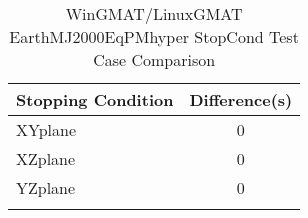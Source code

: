 \begin{table}[htbp!]
\centering
\caption{ WinGMAT/LinuxGMAT EarthMJ2000EqPMhyper StopCond Test Case Comparison}
      \begin{tabular}{lc}
      \hline\hline
          Stopping Condition & Difference(s) \\
         \hline
         XYplane & 0 \\
         XZplane & 0 \\
         YZplane & 0 \\
      \hline\hline
      \label{Table: WinGMAT-LinuxGMAT EarthMJ2000EqPMhyper StopCond Table} 
\end{tabular}
\end{table}
